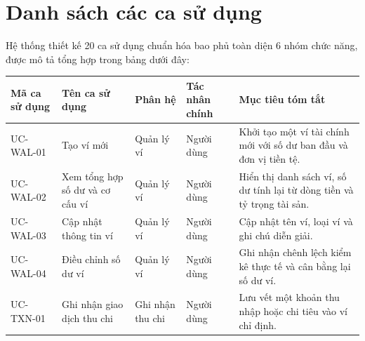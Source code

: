 \documentclass[a4paper,12pt]{report}
\newcounter{none}
\begin{document}
\section{Danh sách các ca sử
dụng}\label{danh-suxe1ch-cuxe1c-ca-sux1eed-dux1ee5ng}

Hệ thống thiết kế 20 ca sử dụng chuẩn hóa bao phủ toàn diện 6 nhóm chức
năng, được mô tả tổng hợp trong bảng dưới đây:

{\def\LTcaptype{none} %
\begin{longtable}[]{@{}
  >{\raggedright\arraybackslash}p{}
  >{\raggedright\arraybackslash}p{}
  >{\raggedright\arraybackslash}p{}
  >{\raggedright\arraybackslash}p{}
  >{\raggedright\arraybackslash}p{}@{}}
\toprule\noalign{}
\begin{minipage}[b]{\linewidth}\raggedright
Mã ca sử dụng
\end{minipage} & \begin{minipage}[b]{\linewidth}\raggedright
Tên ca sử dụng
\end{minipage} & \begin{minipage}[b]{\linewidth}\raggedright
Phân hệ
\end{minipage} & \begin{minipage}[b]{\linewidth}\raggedright
Tác nhân chính
\end{minipage} & \begin{minipage}[b]{\linewidth}\raggedright
Mục tiêu tóm tắt
\end{minipage} \\
\midrule\noalign{}
\endhead
\bottomrule\noalign{}
\endlastfoot
UC-WAL-01 & Tạo ví mới & Quản lý ví & Người dùng & Khởi tạo một ví tài
chính mới với số dư ban đầu và đơn vị tiền tệ. \\
UC-WAL-02 & Xem tổng hợp số dư và cơ cấu ví & Quản lý ví & Người dùng &
Hiển thị danh sách ví, số dư tính lại từ dòng tiền và tỷ trọng tài
sản. \\
UC-WAL-03 & Cập nhật thông tin ví & Quản lý ví & Người dùng & Cập nhật
tên ví, loại ví và ghi chú diễn giải. \\
UC-WAL-04 & Điều chỉnh số dư ví & Quản lý ví & Người dùng & Ghi nhận
chênh lệch kiểm kê thực tế và cân bằng lại số dư ví. \\
UC-TXN-01 & Ghi nhận giao dịch thu chi & Ghi nhận thu chi & Người dùng &
Lưu vết một khoản thu nhập hoặc chi tiêu vào ví chỉ định. \\

\end{longtable}}
\end{document}
